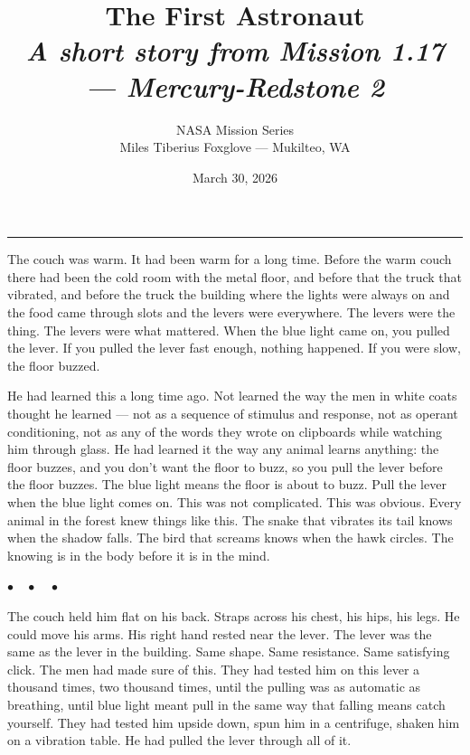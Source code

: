 \documentclass[12pt, letterpaper]{article}
\title{\Huge\textbf{The First Astronaut}\\[0.5em]\large\textit{A short story from Mission 1.17 --- Mercury-Redstone 2}}
\author{NASA Mission Series\\[0.3em]\small Miles Tiberius Foxglove --- Mukilteo, WA}
\date{March 30, 2026}
\begin{document}
\maketitle
\thispagestyle{empty}

\vspace{1em}
\noindent\rule{\textwidth}{0.4pt}
\vspace{1em}

\noindent The couch was warm. It had been warm for a long time. Before the warm couch there had been the cold room with the metal floor, and before that the truck that vibrated, and before the truck the building where the lights were always on and the food came through slots and the levers were everywhere. The levers were the thing. The levers were what mattered. When the blue light came on, you pulled the lever. If you pulled the lever fast enough, nothing happened. If you were slow, the floor buzzed.

He had learned this a long time ago. Not learned the way the men in white coats thought he learned --- not as a sequence of stimulus and response, not as operant conditioning, not as any of the words they wrote on clipboards while watching him through glass. He had learned it the way any animal learns anything: the floor buzzes, and you don't want the floor to buzz, so you pull the lever before the floor buzzes. The blue light means the floor is about to buzz. Pull the lever when the blue light comes on. This was not complicated. This was obvious. Every animal in the forest knew things like this. The snake that vibrates its tail knows when the shadow falls. The bird that screams knows when the hawk circles. The knowing is in the body before it is in the mind.

\begin{center}
$\bullet\quad\bullet\quad\bullet$
\end{center}

The couch held him flat on his back. Straps across his chest, his hips, his legs. He could move his arms. His right hand rested near the lever. The lever was the same as the lever in the building. Same shape. Same resistance. Same satisfying click. The men had made sure of this. They had tested him on this lever a thousand times, two thousand times, until the pulling was as automatic as breathing, until blue light meant pull in the same way that falling means catch yourself. They had tested him upside down, spun him in a centrifuge, shaken him on a vibration table. He had pulled the lever through all of it.
\end{document}
